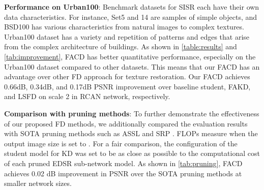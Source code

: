 \documentclass[10pt,twocolumn,letterpaper]{article}
\begin{document}
\noindent \textbf{Performance on Urban100}: Benchmark datasets for SISR each have their own data characteristics. For instance, Set5 and 14 are samples of simple objects, and BSD100 has various characteristics from natural images to complex textures. Urban100 dataset has a variety and repetition of patterns and edges that arise from the complex architecture of buildings. As shown in \cref{table:results} and \cref{tab:improvement}, FACD has better quantitative performance, especially on the Urban100 dataset compared to other datasets. This means that our FACD has an advantage over other FD approach for texture restoration. Our FACD achieves 0.66dB, 0.34dB, and 0.17dB PSNR improvement over baseline student, FAKD, and LSFD on scale 2 in RCAN network, respectively. 


\begin{table}[]
\caption{Evaluation results on average PSNR improvement over other FD approaches. Performance improvement over 0.1dB is marked in \underline{underlined}. }
\label{tab:improvement}
\end{table}

\noindent \textbf{Comparison with pruning methods}: To further demonstrate the effectiveness of our proposed FD methods, we additionally compared the evaluation results with SOTA pruning methods such as ASSL \cite{assl} and SRP \cite{srp}. FLOPs measure when the output image size is set to . For a fair comparison, the configuration of the student model for KD was set to be as close as possible to the computational cost of each pruned EDSR sub-network model. As shown in \cref{tab:pruning}, FACD achieves 0.02 dB improvement in PSNR over the SOTA pruning methods at smaller network sizes.
\end{document}
